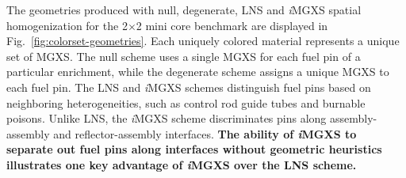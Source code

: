 \documentclass[12pt,twoside]{mitthesis-exec}
\begin{document}
The geometries produced with null, degenerate, LNS and \textit{i}MGXS spatial homogenization for the 2$\times$2 mini core benchmark are displayed in Fig.~\ref{fig:colorset-geometries}. Each uniquely colored material represents a unique set of MGXS. The null scheme uses a single MGXS for each fuel pin of a particular enrichment, while the degenerate scheme assigns a unique MGXS to each fuel pin. The LNS and \textit{i}MGXS schemes distinguish fuel pins based on neighboring heterogeneities, such as control rod guide tubes and burnable poisons. Unlike LNS, the \textit{i}MGXS scheme discriminates pins along assembly-assembly and reflector-assembly interfaces. \textbf{The ability of \textit{i}MGXS to separate out fuel pins along interfaces without geometric heuristics illustrates one key advantage of \textit{i}MGXS over the LNS scheme.}

\end{document}
